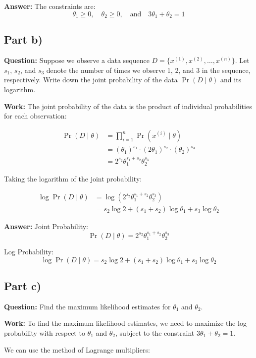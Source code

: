 \documentclass{article}
\begin{document}
\textbf{Answer:}
The constraints are:
\[ \theta_1 \geq 0, \quad \theta_2 \geq 0, \quad \text{and} \quad 3\theta_1 + \theta_2 = 1 \]

\subsection*{Part b)}

\textbf{Question:} Suppose we observe a data sequence $D = \{x^{(1)}, x^{(2)}, \ldots, x^{(n)}\}$. Let $s_1$, $s_2$, and $s_3$ denote the number of times we observe 1, 2, and 3 in the sequence, respectively. Write down the joint probability of the data $\Pr(D \mid \theta)$ and its logarithm.

\textbf{Work:}
The joint probability of the data is the product of individual probabilities for each observation:

\begin{align*}
\Pr(D \mid \theta) &= \prod_{i=1}^n \Pr(x^{(i)} \mid \theta) \\
&= (\theta_1)^{s_1} \cdot (2\theta_1)^{s_2} \cdot (\theta_2)^{s_3} \\
&= 2^{s_2} \theta_1^{s_1 + s_2} \theta_2^{s_3}
\end{align*}

Taking the logarithm of the joint probability:

\begin{align*}
\log \Pr(D \mid \theta) &= \log(2^{s_2} \theta_1^{s_1 + s_2} \theta_2^{s_3}) \\
&= s_2 \log 2 + (s_1 + s_2) \log \theta_1 + s_3 \log \theta_2
\end{align*}

\textbf{Answer:}
Joint Probability:
\[ \Pr(D \mid \theta) = 2^{s_2} \theta_1^{s_1 + s_2} \theta_2^{s_3} \]

Log Probability:
\[ \log \Pr(D \mid \theta) = s_2 \log 2 + (s_1 + s_2) \log \theta_1 + s_3 \log \theta_2 \]

\subsection*{Part c)}

\textbf{Question:} Find the maximum likelihood estimates for $\theta_1$ and $\theta_2$.

\textbf{Work:}
To find the maximum likelihood estimates, we need to maximize the log probability with respect to $\theta_1$ and $\theta_2$, subject to the constraint $3\theta_1 + \theta_2 = 1$.

We can use the method of Lagrange multipliers:
\end{document}
